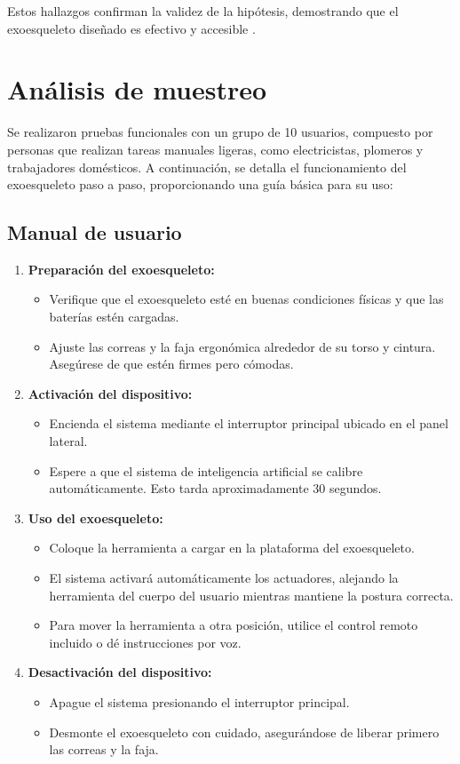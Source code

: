 Estos hallazgos confirman la validez de la hipótesis, demostrando que el exoesqueleto diseñado es efectivo y accesible \cite{Lopez2033}.

\section{Análisis de muestreo}
Se realizaron pruebas funcionales con un grupo de 10 usuarios, compuesto por personas que realizan tareas manuales ligeras, como electricistas, plomeros y trabajadores domésticos. A continuación, se detalla el funcionamiento del exoesqueleto paso a paso, proporcionando una guía básica para su uso:

\subsection{Manual de usuario}
\begin{enumerate}
    \item \textbf{Preparación del exoesqueleto:}
    \begin{itemize}
        \item Verifique que el exoesqueleto esté en buenas condiciones físicas y que las baterías estén cargadas.
        \item Ajuste las correas y la faja ergonómica alrededor de su torso y cintura. Asegúrese de que estén firmes pero cómodas.
    \end{itemize}
    \item \textbf{Activación del dispositivo:}
    \begin{itemize}
        \item Encienda el sistema mediante el interruptor principal ubicado en el panel lateral.
        \item Espere a que el sistema de inteligencia artificial se calibre automáticamente. Esto tarda aproximadamente 30 segundos.
    \end{itemize}
    \item \textbf{Uso del exoesqueleto:}
    \begin{itemize}
        \item Coloque la herramienta a cargar en la plataforma del exoesqueleto.
        \item El sistema activará automáticamente los actuadores, alejando la herramienta del cuerpo del usuario mientras mantiene la postura correcta.
        \item Para mover la herramienta a otra posición, utilice el control remoto incluido o dé instrucciones por voz.
    \end{itemize}
    \item \textbf{Desactivación del dispositivo:}
    \begin{itemize}
        \item Apague el sistema presionando el interruptor principal.
        \item Desmonte el exoesqueleto con cuidado, asegurándose de liberar primero las correas y la faja.
    \end{itemize}
\end{enumerate}

